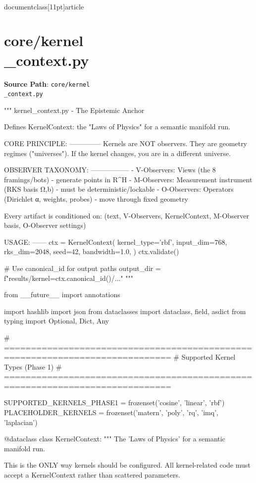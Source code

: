 \\documentclass[11pt]{article}
\begin{document}
\section*{core/kernel\\_context.py}
\textbf{Source Path}: \texttt{core/kernel\\_context.py}\par
\bigskip
\begin{CodeBlock}
"""
kernel_context.py - The Epistemic Anchor

Defines KernelContext: the "Laws of Physics" for a semantic manifold run.

CORE PRINCIPLE:
--------------
Kernels are NOT observers. They are geometry regimes ("universes").
If the kernel changes, you are in a different universe.

OBSERVER TAXONOMY:
-----------------
- V-Observers: Views (the 8 framings/bots) - generate points in R^H
- M-Observers: Measurement instrument (RKS basis Ω,b) - must be deterministic/lockable
- O-Observers: Operators (Dirichlet α, weights, probes) - move through fixed geometry

Every artifact is conditioned on:
    (text, V-Observers, KernelContext, M-Observer basis, O-Observer settings)

USAGE:
------
    ctx = KernelContext(
        kernel_type='rbf',
        input_dim=768,
        rks_dim=2048,
        seed=42,
        bandwidth=1.0,
    )
    ctx.validate()
    
    # Use canonical_id for output paths
    output_dir = f"results/kernel={ctx.canonical_id()}/..."
"""

from __future__ import annotations

import hashlib
import json
from dataclasses import dataclass, field, asdict
from typing import Optional, Dict, Any


# =============================================================================
# Supported Kernel Types (Phase 1)
# =============================================================================

SUPPORTED_KERNELS_PHASE1 = frozenset({'cosine', 'linear', 'rbf'})
PLACEHOLDER_KERNELS = frozenset({'matern', 'poly', 'rq', 'imq', 'laplacian'})


@dataclass
class KernelContext:
    """
    The 'Laws of Physics' for a semantic manifold run.
    
    This is the ONLY way kernels should be configured. All kernel-related
    code must accept a KernelContext rather than scattered parameters.
    

\end{CodeBlock}
\end{document}
